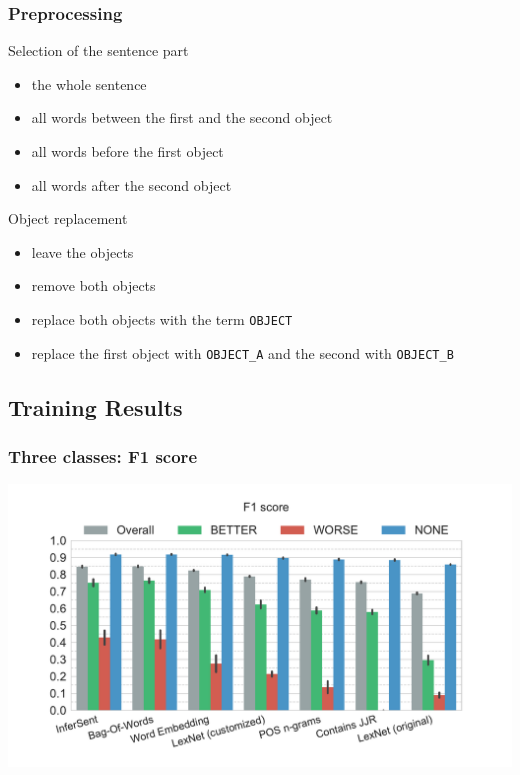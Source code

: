 \documentclass[11pt,aspectratio=169,usenames,dvipsnames]{beamer}
\begin{document}
    
    \begin{frame}[t]
    \frametitle{Preprocessing}
    Selection of the sentence part
        \begin{itemize}
    \item the whole sentence
    \item all words between the first and the second object
    \item all words before the first object
    \item all words after the second object\pause
    \end{itemize}
    Object replacement
    \begin{itemize}
    \item leave the objects
    \item remove both objects
    \item replace both objects with the term \texttt{OBJECT}
    \item replace the first object with \texttt{OBJECT\_A} and the second with \texttt{OBJECT\_B} 
    \end{itemize}
    


    \end{frame}


    \subsection{Training Results}
    \frame{\subsectionpage}
    \begin{frame}[t]
        \frametitle{Three classes: F1 score}
        \centerline{\includegraphics[scale=0.45,trim={0 0 0 0.5cm},clip]{images/experiments/p-f1-False}}
    \end{frame}
\end{document}
